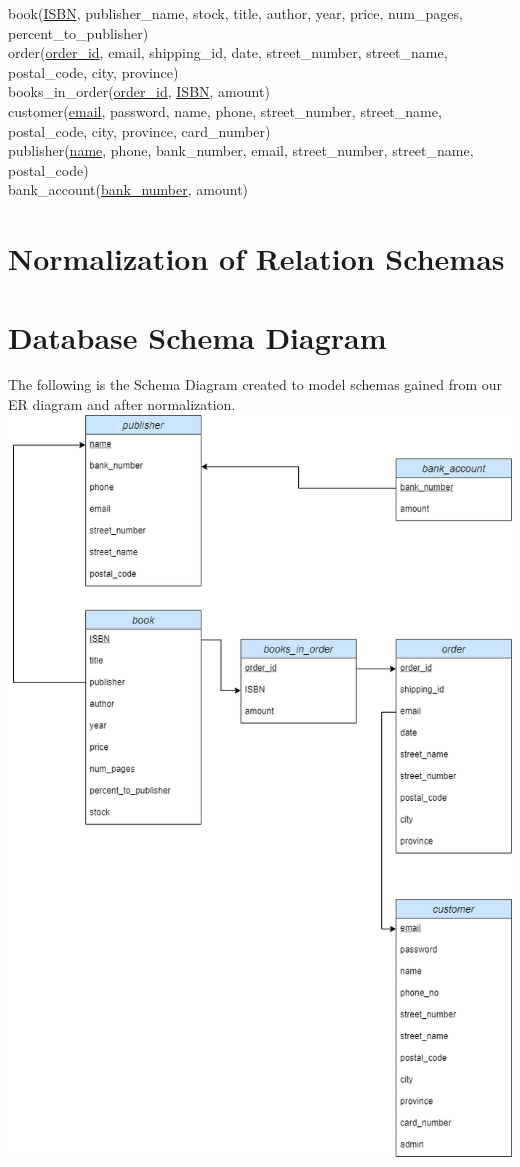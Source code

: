 \documentclass[a4 paper]{article}
\begin{document}
book(\underline{ISBN}, publisher\_name, stock, title, author, year, price, num\_pages, percent\_to\_publisher)\\
\indent order(\underline{order\_id}, email, shipping\_id, date, street\_number, street\_name, postal\_code, city, province)\\
\indent books\_in\_order(\underline{order\_id}, \underline{ISBN}, amount)\\
\indent customer(\underline{email}, password, name, phone, street\_number, street\_name, postal\_code, city, province, card\_number)\\
\indent publisher(\underline{name}, phone, bank\_number, email, street\_number, street\_name, postal\_code)\\
\indent bank\_account(\underline{bank\_number}, amount)\\

\section{Normalization of Relation Schemas}

\section{Database Schema Diagram}

The following is the Schema Diagram created to model schemas gained from our ER diagram and after normalization.\\

\includegraphics[scale=0.5]{../Diagrams/Schema-diagram-comp3005-finalproject.drawio.png}\\
\end{document}

